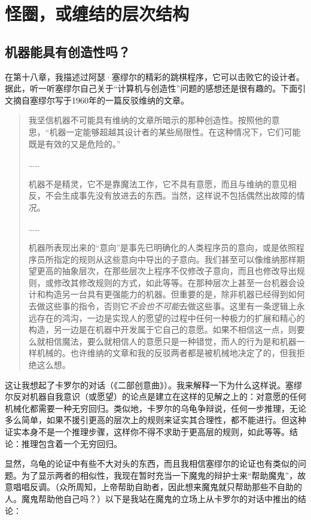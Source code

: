 
\chapter{怪圈，或缠结的层次结构}

\section{机器能具有创造性吗？}

在第十八章，我描述过阿瑟·塞缪尔的精彩的跳棋程序，它可以击败它的设计者。据此，听一听塞缪尔自己关于“计算机与创造性”问题的感想还是很有趣的。下面引文摘自塞缪尔写于1960年的一篇反驳维纳的文章。

\begin{quote}
我坚信机器不可能具有维纳的文章所暗示的那种创造性。按照他的意思，“机器一定能够超越其设计者的某些局限性。在这种情况下，它们可能既是有效的又是危险的。”

……

机器不是精灵，它不是靠魔法工作，它不具有意愿，而且与维纳的意见相反，不会生成事先没有放进去的东西。当然，这样说不包括偶然出故障的情况。

……

机器所表现出来的“意向”是事先已明确化的人类程序员的意向，或是依照程序员所指定的规则从这些意向中导出的子意向。我们甚至可以像维纳那样期望更高的抽象层次，在那些层次上程序不仅修改子意向，而且也修改导出规则，或修改其修改规则的方式，如此等等。在那种层次上甚至一台机器会设计和构造另一台具有更强能力的机器。但重要的是，除非机器已经得到如何去做这些事的指令，否则它\emph{不会也不可能}去做这些事。这里有一条逻辑上永远存在的鸿沟，一边是实现人的愿望的过程中任何一种极力的扩展和精心的构造，另一边是在机器中开发属于它自己的意愿。如果不相信这一点，则要么就相信魔法，要么就相信人的意愿只是一种错觉，而人的行为是和机器一样机械的。也许维纳的文章和我的反驳两者都是被机械地决定了的，但我拒绝这么想。
\end{quote}

这让我想起了卡罗尔的对话（《二部创意曲》）。我来解释一下为什么这样说。塞缪尔反对机器自我意识（或愿望）的论点是建立在这样的见解之上的：对意愿的任何机械化都需要一种无穷回归。类似地，卡罗尔的乌龟争辩说，任何一步推理，无论多么简单，如果不援引更高的层次上的规则来证实其合理性，都不能进行。但这种证实本身不是一个推理步骤，这样你不得不求助于更高层的规则，如此等等。结论：推理包含着一个无穷回归。

显然，乌龟的论证中有些不大对头的东西，而且我相信塞缪尔的论证也有类似的问题。为了显示两者的相似性，我现在暂时充当一下魔鬼的辩护士来“帮助魔鬼”，故意唱唱反调。（众所周知，上帝帮助自助者，因此想来魔鬼就只帮助那些不自助的人。魔鬼帮助他自己吗？）以下是我站在魔鬼的立场上从卡罗尔的对话中推出的结论：

